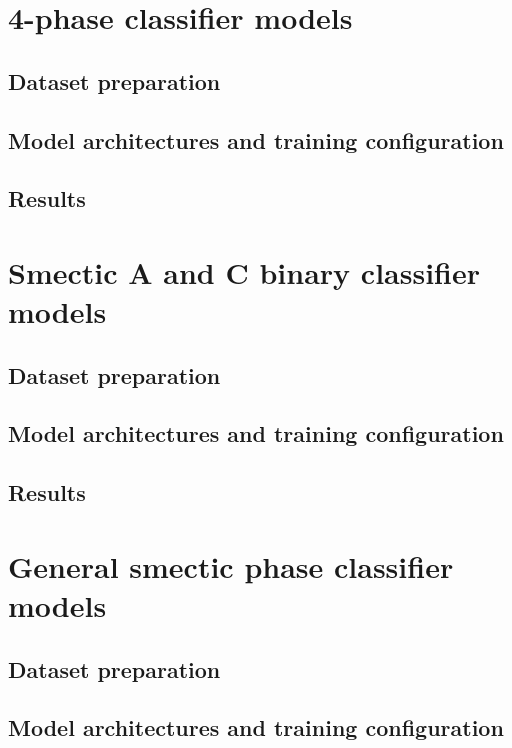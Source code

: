 \documentclass[12pt]{article}
\begin{document}
\section{4-phase classifier models}

\subsection{Dataset preparation}

\subsection{Model architectures and training configuration}

\subsection{Results}

\section{Smectic A and C binary classifier models}

\subsection{Dataset preparation}

\subsection{Model architectures and training configuration}

\subsection{Results}

\section{General smectic phase classifier models}

\subsection{Dataset preparation}

\subsection{Model architectures and training configuration}
\end{document}
